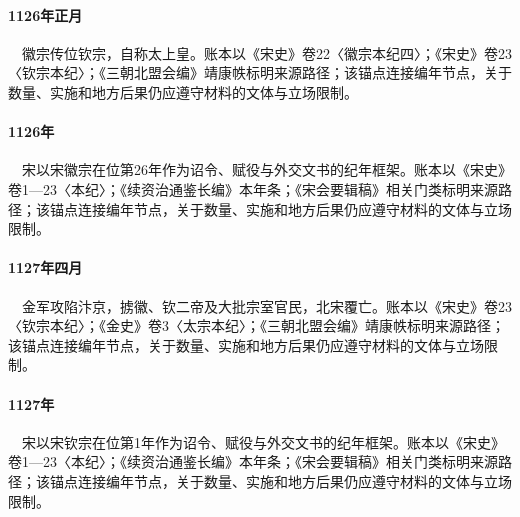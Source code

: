 \paragraph{1126年正月}　徽宗传位钦宗，自称太上皇。账本以《宋史》卷22〈徽宗本纪四〉；《宋史》卷23〈钦宗本纪〉；《三朝北盟会编》靖康帙标明来源路径；该锚点连接编年节点，关于数量、实施和地方后果仍应遵守材料的文体与立场限制。

\paragraph{1126年}　宋以宋徽宗在位第26年作为诏令、赋役与外交文书的纪年框架。账本以《宋史》卷1—23〈本纪〉；《续资治通鉴长编》本年条；《宋会要辑稿》相关门类标明来源路径；该锚点连接编年节点，关于数量、实施和地方后果仍应遵守材料的文体与立场限制。

\paragraph{1127年四月}　金军攻陷汴京，掳徽、钦二帝及大批宗室官民，北宋覆亡。账本以《宋史》卷23〈钦宗本纪〉；《金史》卷3〈太宗本纪〉；《三朝北盟会编》靖康帙标明来源路径；该锚点连接编年节点，关于数量、实施和地方后果仍应遵守材料的文体与立场限制。

\paragraph{1127年}　宋以宋钦宗在位第1年作为诏令、赋役与外交文书的纪年框架。账本以《宋史》卷1—23〈本纪〉；《续资治通鉴长编》本年条；《宋会要辑稿》相关门类标明来源路径；该锚点连接编年节点，关于数量、实施和地方后果仍应遵守材料的文体与立场限制。
